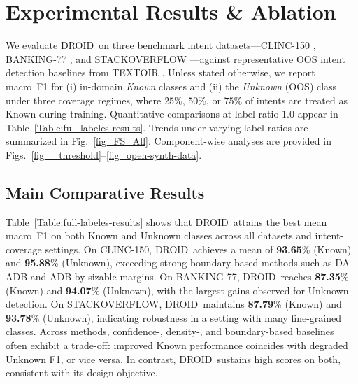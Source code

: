 \documentclass[journal,letterpaper]{IEEEtran}
\newcommand{\method}{\textsc{DROID}}
\begin{document}
\section{Experimental Results \& Ablation}
\label{sec:results}

We evaluate \method\ on three benchmark intent datasets---\textsc{CLINC-150} \cite{Larson_2019}, \textsc{BANKING-77} \cite{Casanueva_2020}, and \textsc{STACKOVERFLOW} \cite{Xu_2015}---against representative OOS intent detection baselines from TEXTOIR \cite{zhang-etal-2021-textoir}. Unless stated otherwise, we report macro~F1 for (i) in-domain \emph{Known} classes and (ii) the \emph{Unknown} (OOS) class under three coverage regimes, where $25\%$, $50\%$, or $75\%$ of intents are treated as Known during training. Quantitative comparisons at label ratio $1.0$ appear in Table~\ref{Table:full-labeles-results}. Trends under varying label ratios are summarized in Fig.~\ref{fig_FS_All}. Component-wise analyses are provided in Figs.~\ref{fig__threshold}--\ref{fig_open-synth-data}. 

\subsection{Main Comparative Results}
Table~\ref{Table:full-labeles-results} shows that \method\ attains the best mean macro~F1 on both Known and Unknown classes across all datasets and intent-coverage settings. 
On \textsc{CLINC-150}, \method\ achieves a mean of \textbf{93.65}\% (Known) and \textbf{95.88}\% (Unknown), exceeding strong boundary-based methods such as DA-ADB and ADB by sizable margins.
On \textsc{BANKING-77}, \method\ reaches \textbf{87.35}\% (Known) and \textbf{94.07}\% (Unknown), with the largest gains observed for Unknown detection. 
On \textsc{STACKOVERFLOW}, \method\ maintains \textbf{87.79}\% (Known) and \textbf{93.78}\% (Unknown), indicating robustness in a setting with many fine-grained classes. 
Across methods, confidence-, density-, and boundary-based baselines often exhibit a trade-off: improved Known performance coincides with degraded Unknown F1, or vice versa. In contrast, \method\ sustains high scores on both, consistent with its design objective.
\end{document}
